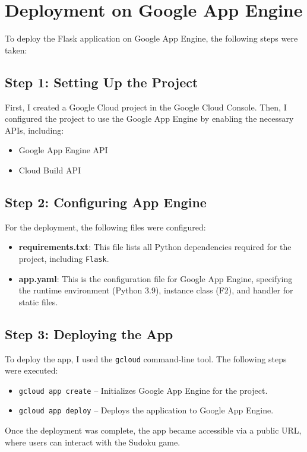 \documentclass[12pt]{article}
\begin{document}
\section{Deployment on Google App Engine}

To deploy the Flask application on Google App Engine, the following steps were taken:

\subsection{Step 1: Setting Up the Project}
First, I created a Google Cloud project in the Google Cloud Console. Then, I configured the project to use the Google App Engine by enabling the necessary APIs, including:
\begin{itemize}
    \item Google App Engine API
    \item Cloud Build API
\end{itemize}

\subsection{Step 2: Configuring App Engine}
For the deployment, the following files were configured:
\begin{itemize}
    \item \textbf{requirements.txt}: This file lists all Python dependencies required for the project, including \texttt{Flask}.
    \item \textbf{app.yaml}: This is the configuration file for Google App Engine, specifying the runtime environment (Python 3.9), instance class (F2), and handler for static files.
\end{itemize}

\subsection{Step 3: Deploying the App}
To deploy the app, I used the \texttt{gcloud} command-line tool. The following steps were executed:
\begin{itemize}
    \item \texttt{gcloud app create} -- Initializes Google App Engine for the project.
    \item \texttt{gcloud app deploy} -- Deploys the application to Google App Engine.
\end{itemize}
Once the deployment was complete, the app became accessible via a public URL, where users can interact with the Sudoku game.
\end{document}
